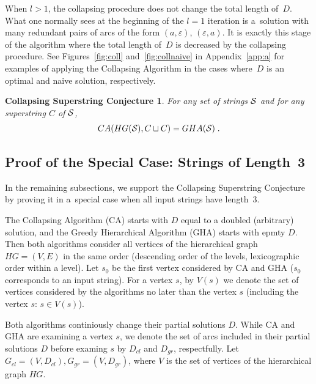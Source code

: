 \documentclass[11pt]{article}
\newcommand{\cld}{D_{cl}}
\newcommand{\grd}{D_{gr}}
\newcommand{\clgraph}{G_{cl}}
\newcommand{\grgraph}{G_{gr}}
\begin{document}
When $l>1$, the collapsing procedure does not change the total length of~$D$. 
What one normally sees at the beginning of the
$l=1$ iteration is a~solution with many 
redundant pairs of arcs of the form $(a, \varepsilon)$, $(\varepsilon, a)$. It is exactly this stage of the algorithm where the total length of~$D$ is decreased by the collapsing procedure. See Figures~\ref{fig:coll} and~\ref{fig:collnaive} in Appendix~\ref{app:a} for examples of applying the Collapsing Algorithm in the cases where~$D$ is an optimal and naive solution, respectively.


\newtheorem*{scs}{Collapsing Superstring Conjecture}
\begin{scs}
For any set of strings ${\cal S}$ and for any superstring $C$ of ${\cal S}$, 
\begin{align*}
CA(HG({\cal S}), C \sqcup C) = GHA({\cal S}) \; .
\end{align*}
\end{scs}


\subsection{Proof of the Special Case: Strings of Length~3}\label{subsec:scs3}
In the remaining subsections, we support the Collapsing Superstring Conjecture by proving it in a~special case when all input strings have length~3.

The Collapsing Algorithm (CA) starts with $D$ equal to a doubled (arbitrary) solution, and the Greedy Hierarchical Algorithm (GHA) starts with epmty $D$. Then both algorithms consider all vertices of the hierarchical graph $HG=(V, E)$ in the same order (descending order of the levels, lexicographic order within a level). Let $s_0$ be the first vertex considered by CA and GHA ($s_0$ corresponds to an input string). For a vertex $s$, by $V(s)$ we denote the set of vertices considered by the algorithms no later than the vertex $s$ (including the vertex $s$: $s\in V(s)$).

Both algorithms continiously change their partial solutions $D$. While CA and GHA are examining a vertex $s$, we denote the set of arcs included in their partial solutions $D$ before examing $s$ by $\cld{}$ and $\grd{}$, respectfully. Let $\clgraph = (V, \cld), \grgraph = (V, \grd)$, where $V$ is the set of vertices of the hierarchical graph $HG$. 
\end{document}
